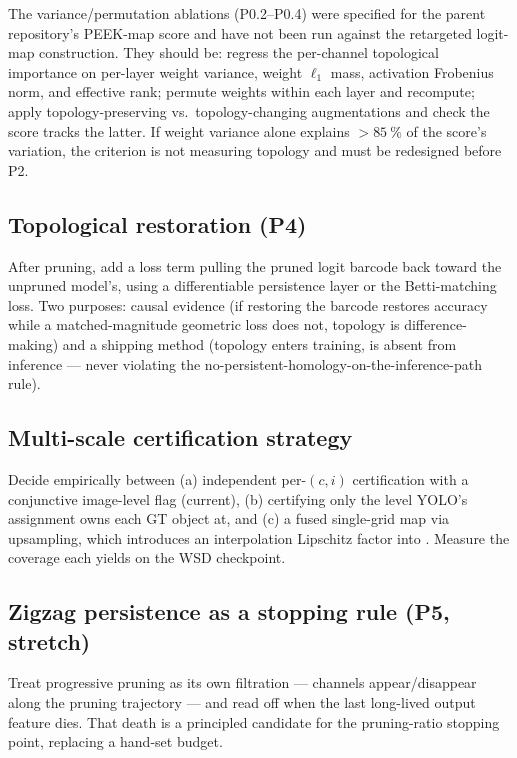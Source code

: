\documentclass[11pt]{article}
\theoremstyle{definition}
\theoremstyle{plain}
\begin{document}
The variance/permutation ablations (P0.2--P0.4) were specified for the parent
repository's PEEK-map score and have not been run against the retargeted
logit-map construction. They should be: regress the per-channel topological
importance on per-layer weight variance, weight $\ell_1$ mass, activation
Frobenius norm, and effective rank; permute weights within each layer and
recompute; apply topology-preserving vs.\ topology-changing augmentations and
check the score tracks the latter. If weight variance alone explains
$>\SI{85}{\percent}$ of the score's variation, the criterion is not measuring
topology and must be redesigned before P2.

\subsection{Topological restoration (P4)}

After pruning, add a loss term pulling the pruned logit barcode back toward the
unpruned model's, using a differentiable persistence layer or the Betti-matching
loss. Two purposes: causal evidence (if restoring the barcode restores accuracy
while a matched-magnitude geometric loss does not, topology is difference-making)
and a shipping method (topology enters training, is absent from inference ---
never violating the no-persistent-homology-on-the-inference-path rule).

\subsection{Multi-scale certification strategy}

Decide empirically between (a) independent per-$(c,i)$ certification with a
conjunctive image-level flag (current), (b) certifying only the level YOLO's
assignment owns each GT object at, and (c) a fused single-grid map via
upsampling, which introduces an interpolation Lipschitz factor into
. Measure the coverage each yields on the WSD checkpoint.

\subsection{Zigzag persistence as a stopping rule (P5, stretch)}

Treat progressive pruning as its own filtration --- channels appear/disappear
along the pruning trajectory --- and read off when the last long-lived output
feature dies. That death is a principled candidate for the pruning-ratio stopping
point, replacing a hand-set budget.
\end{document}
